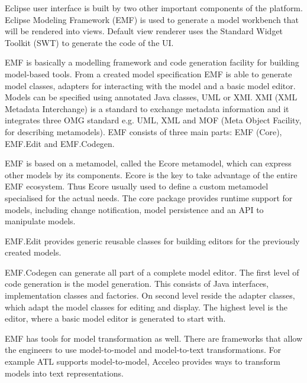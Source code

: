 Eclipse user interface is built by two other important components of the platform. Eclipse Modeling Framework (EMF) is used to generate a model workbench that will be rendered into views. Default view renderer uses the Standard Widget Toolkit (SWT) to generate the code of the UI.

EMF is basically a modelling framework and code generation facility for building model-based tools. From a created model specification EMF is able to generate model classes, adapters for interacting with the model and a basic model editor.  Models can be specified using annotated Java classes, UML or XMI. XMI (XML Metadata Interchange) is a standard to exchange metadata information and it integrates three OMG standard e.g. UML, XML and MOF (Meta Object Facility, for describing metamodels). EMF consists of three main parts: EMF (Core), EMF.Edit and EMF.Codegen.

EMF is based on a metamodel, called the Ecore metamodel, which can express other models by its components. Ecore is the key to take advantage of the entire EMF ecosystem. Thus Ecore usually used to define a custom metamodel specialised for the actual needs. The core package provides runtime support for models, including change notification, model persistence and an API to manipulate models.

EMF.Edit provides generic reusable classes for building editors for the previously created models.

EMF.Codegen can generate all part of a complete model editor. The first level of code generation is the model generation. This consists of Java interfaces, implementation classes and factories. On second level reside the adapter classes, which adapt the model classes for editing and display. The highest level is the editor, where a basic model editor is generated to start with.

EMF has tools for model transformation as well. There are frameworks that allow the engineers to use model-to-model and model-to-text transformations. For example ATL supports model-to-model, Acceleo \cite{acceleo} provides ways to transform models into text representations.




